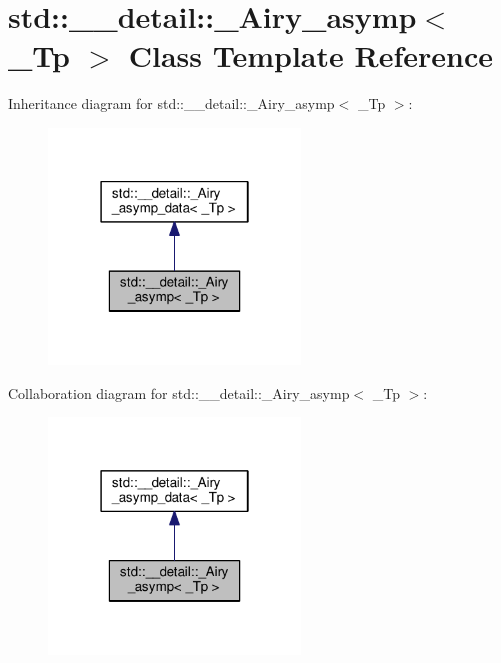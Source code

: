 \hypertarget{classstd_1_1____detail_1_1__Airy__asymp}{}\section{std\+:\+:\+\_\+\+\_\+detail\+:\+:\+\_\+\+Airy\+\_\+asymp$<$ \+\_\+\+Tp $>$ Class Template Reference}
\label{classstd_1_1____detail_1_1__Airy__asymp}


Inheritance diagram for std\+:\+:\+\_\+\+\_\+detail\+:\+:\+\_\+\+Airy\+\_\+asymp$<$ \+\_\+\+Tp $>$\+:
\nopagebreak
\begin{figure}[H]
\begin{center}
\leavevmode
\includegraphics[width=190pt]{classstd_1_1____detail_1_1__Airy__asymp__inherit__graph}
\end{center}
\end{figure}


Collaboration diagram for std\+:\+:\+\_\+\+\_\+detail\+:\+:\+\_\+\+Airy\+\_\+asymp$<$ \+\_\+\+Tp $>$\+:
\nopagebreak
\begin{figure}[H]
\begin{center}
\leavevmode
\includegraphics[width=190pt]{classstd_1_1____detail_1_1__Airy__asymp__coll__graph}
\end{center}
\end{figure}
